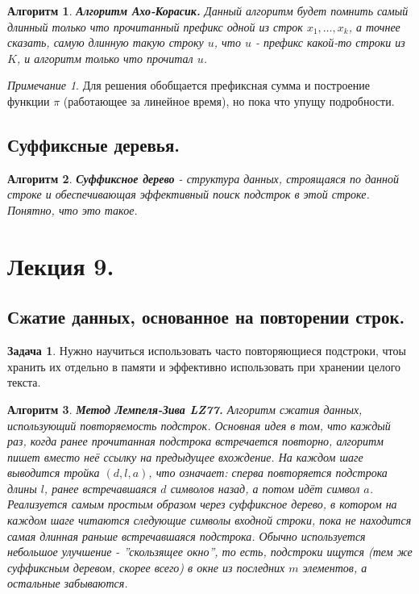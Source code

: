 \documentclass[a4paper]{article}
\theoremstyle{indented}
\newtheorem{alg}{Алгоритм}
\theoremstyle{definition}
\newtheorem{prob}{Задача}
\theoremstyle{remark}
\newtheorem{remark}{Примечание}
\begin{document}
\begin{alg}
    \textbf{Алгоритм Ахо-Корасик.} Данный алгоритм будет помнить самый длинный только что прочитанный префикс одной из строк $x_1, \ldots, x_k$, а точнее сказать, самую длинную такую строку $u$, что $u$ - префикс какой-то строки из $K$, и алгоритм только что прочитал $u$. 
\end{alg}

\begin{remark}
    Для решения обобщается префиксная сумма и построение функции $\pi$ (работающее за линейное время), но пока что упущу подробности.
\end{remark}

\subsection{Суффиксные деревья.}

\begin{alg}
    \textbf{Суффиксное дерево} - структура данных, строящаяся по данной строке и обеспечивающая эффективный поиск подстрок в этой строке. Понятно, что это такое.  
\end{alg}

\section{Лекция 9.}

\subsection{Сжатие данных, основанное на повторении строк.}

\begin{prob}
    Нужно научиться использовать часто повторяющиеся подстроки, чтоы хранить их отдельно в памяти и эффективно использовать при хранении целого текста.
\end{prob}

\begin{alg}
    \textbf{Метод Лемпеля-Зива LZ77.} Алгоритм сжатия данных, использующий повторяемость подстрок. Основная идея в том, что каждый раз, когда ранее прочитанная подстрока встречается повторно, алгоритм пишет вместо неё ссылку на предыдущее вхождение. На каждом шаге выводится тройка $(d, l, a)$, что означает: сперва повторяется подстрока длины $l$, ранее встречавшаяся $d$ символов назад, а потом идёт символ $a$. Реализуется самым простым образом через суффиксное дерево, в котором на каждом шаге читаются следующие символы входной строки, пока не находится самая длинная раньше встречавшаяся подстрока. Обычно используется небольшое улучшение - \textit{''скользящее окно''}, то есть, подстроки ищутся (тем же суффиксным деревом, скорее всего) в окне из последних $m$ элементов, а остальные забываются.
\end{alg} \ 
\end{document}
